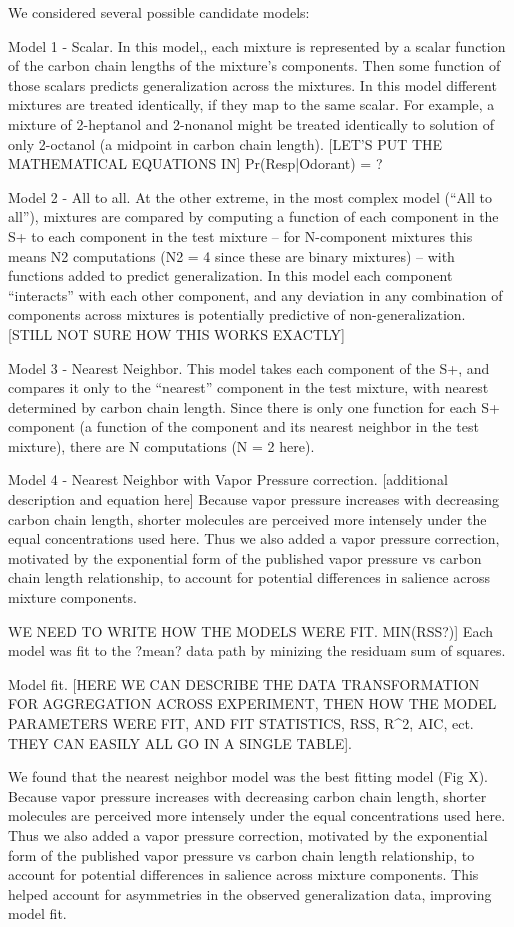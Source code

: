 We considered several possible candidate models:

Model 1 - Scalar. In this model,, each mixture is represented by a scalar function of the carbon chain lengths of the mixture’s components.  Then some function of those scalars predicts generalization across the mixtures.  In this model different mixtures are treated identically, if they map to the same scalar.  For example, a mixture of 2-heptanol and 2-nonanol might be treated identically to solution of only 2-octanol (a midpoint in carbon chain length).  [LET’S PUT THE  MATHEMATICAL EQUATIONS IN]
Pr(Resp|Odorant) =  ? 

Model 2 - All to all.
At the other extreme, in the most complex model (“All to all”), mixtures are compared by computing a function of each component in the S+ to each component in the test mixture -- for N-component mixtures this means N2 computations (N2 = 4 since these are binary mixtures) -- with functions added to predict generalization.  In this model each component “interacts” with each other component, and any deviation in any combination of components across mixtures is potentially predictive of non-generalization.  
[STILL NOT SURE HOW THIS WORKS EXACTLY]

Model 3 - Nearest Neighbor.
This model takes each component of the S+, and compares it only to the “nearest” component in the test mixture, with nearest determined by carbon chain length.  Since there is only one function for each S+ component (a function of the component and its nearest neighbor in the test mixture), there are N computations (N = 2 here).  

Model 4 - Nearest Neighbor with Vapor Pressure correction. 
[additional description and equation here] 
Because vapor pressure increases with decreasing carbon chain length, shorter molecules are perceived more intensely under the equal concentrations used here.  Thus we also added a vapor pressure correction, motivated by the exponential form of the published vapor pressure vs carbon chain length relationship, to account for potential differences in salience across mixture components. 

WE NEED TO WRITE HOW THE MODELS WERE FIT. MIN(RSS?)] Each model was fit to the ?mean? data path by minizing the residuam sum of squares.

Model fit. [HERE WE CAN DESCRIBE THE DATA TRANSFORMATION FOR AGGREGATION ACROSS EXPERIMENT, THEN HOW THE MODEL PARAMETERS WERE FIT, AND FIT STATISTICS, RSS, R^2, AIC, ect. THEY CAN EASILY ALL GO IN A SINGLE TABLE]. 

We found that the nearest neighbor model was the best fitting model (Fig X).  Because vapor pressure increases with decreasing carbon chain length, shorter molecules are perceived more intensely under the equal concentrations used here.  Thus we also added a vapor pressure correction, motivated by the exponential form of the published vapor pressure vs carbon chain length relationship, to account for potential differences in salience across mixture components.  This helped account for asymmetries in the observed generalization data, improving model fit.  
